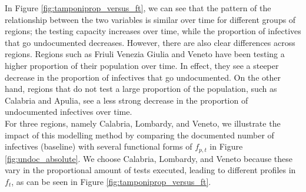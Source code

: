 \documentclass[12pt]{article}
\begin{document}
	In Figure \ref{fig:tamponiprop_versus_ft}, we can see that the pattern of the relationship between the two variables is similar over time for different groups of regions; the testing capacity increases over time, while the proportion of infectives that go undocumented decreases. However, there are also clear differences across regions. Regions such as Friuli Venezia Giulia and Veneto have been testing a higher proportion of their population over time. In effect, they see a steeper decrease in the proportion of infectives that go undocumented. On the other hand, regions that do not test a large proportion of the population, such as Calabria and Apulia, see a less strong decrease in the proportion of undocumented infectives over time. \\
	
	For three regions, namely Calabria, Lombardy, and Veneto, we illustrate the impact of this modelling method by comparing the documented number of infectives (baseline) with several functional forms of $f_{p,t}$ in Figure \ref{fig:undoc_absolute}. We choose Calabria, Lombardy, and Veneto because these vary in the proportional amount of tests executed, leading to different profiles in $f_t$, as can be seen in Figure \ref{fig:tamponiprop_versus_ft}.
	
\end{document}
